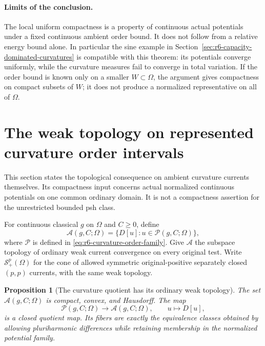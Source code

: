 \documentclass[11pt,a4paper]{article}
\numberwithin{equation}{section}
\newtheorem{proposition}[theorem]{Proposition}
\theoremstyle{definition}
\theoremstyle{remark}
\begin{document}
\paragraph{Limits of the conclusion.}
The local uniform compactness is a property of continuous actual
potentials under a fixed continuous ambient order bound. It does not
follow from a relative energy bound alone. In particular the sine
example in Section~\ref{sec:r6-capacity-dominated-curvatures} is
compatible with this theorem: its potentials converge uniformly,
while the curvature measures fail to converge in total variation.
If the order bound is known only on a smaller $W\subset\Omega$,
the argument gives compactness on compact subsets of $W$; it does
not produce a normalized representative on all of $\Omega$.



\section{The weak topology on represented curvature order intervals}
\label{sec:r6-curvature-interval-topology}

This section states the topological consequence on ambient curvature
currents themselves. Its compactness input concerns actual normalized
continuous potentials on one common ordinary domain. It is not a
compactness assertion for the unrestricted bounded psh class.

For continuous classical $g$ on $\Omega$ and $C\geq0$, define
\[
 \mathscr A(g,C;\Omega)
     =\{D[u]:u\in\mathscr P(g,C;\Omega)\},
\]
where $\mathscr P$ is defined in
\eqref{eq:r6-curvature-order-family}. Give $\mathscr A$ the subspace
topology of ordinary weak current convergence on every original test.
Write $\mathscr S_+^p(\Omega)$ for the cone of allowed symmetric
original-positive separately closed $(p,p)$ currents, with the same
weak topology.

\begin{proposition}[The curvature quotient has its ordinary weak topology]
\label{prop:r6-curvature-interval-quotient-topology}
The set $\mathscr A(g,C;\Omega)$ is compact, convex, and Hausdorff.
The map
\[
 \mathscr P(g,C;\Omega)\longrightarrow\mathscr A(g,C;\Omega),
                          \qquad u\longmapsto D[u],
\]
is a closed quotient map. Its fibers are exactly the equivalence
classes obtained by allowing pluriharmonic differences while retaining
membership in the normalized potential family.
\end{proposition}
\end{document}
